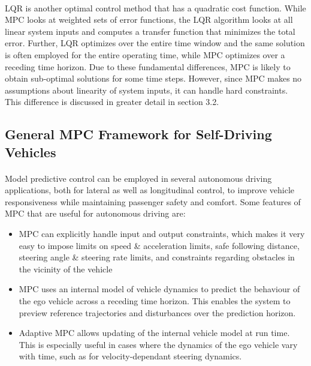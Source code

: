 \paragraph{}
LQR is another optimal control method that has a quadratic cost function. While MPC looks at weighted sets of error functions, the LQR algorithm looks at all linear system inputs and computes a transfer function that minimizes the total error. Further, LQR optimizes over the entire time window and the same solution is often employed for the entire operating time, while MPC optimizes over a receding time horizon. Due to these fundamental differences, MPC is likely to obtain sub-optimal solutions for some time steps. However, since MPC makes no assumptions about linearity of system inputs, it can handle hard constraints. This difference is discussed in greater detail in section 3.2.

\subsection{General MPC Framework for Self-Driving Vehicles}
\paragraph{}
Model predictive control can be employed in several autonomous driving applications, both for lateral as well as longitudinal control, to improve vehicle responsiveness while maintaining passenger safety and comfort. Some features of MPC that are useful for autonomous driving are:
\vspace{-2.5mm}

\begin{itemize}[itemsep=0em]
    \item MPC can explicitly handle input and output constraints, which makes it very easy to impose limits on speed \& acceleration limits, safe following distance, steering angle \& steering rate limits, and constraints regarding obstacles in the vicinity of the vehicle
    \item MPC uses an internal model of vehicle dynamics to predict the behaviour of the ego vehicle across a receding time horizon. This enables the system to preview reference trajectories and disturbances over the prediction horizon.
    \item Adaptive MPC allows updating of the internal vehicle model at run time. This is especially useful in cases where the dynamics of the ego vehicle vary with time, such as for velocity-dependant steering dynamics. 
\end{itemize}


